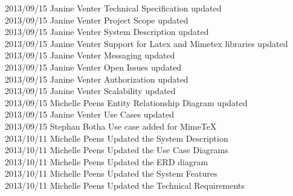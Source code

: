 \documentclass[29pt,a4paper]{moderncv}
\begin{document}
\begin{tabbing}
2013/09/15  \>  Janine Venter \> Technical Specification updated\\
2013/09/15  \> Janine Venter \> Project Scope updated\\
2013/09/15  \>  Janine Venter \> System Description updated\\
2013/09/15 \> Janine Venter \> Support for Latex and Mimetex libraries updated\\
2013/09/15  \> Janine Venter \> Messaging updated\\
2013/09/15  \>  Janine Venter \> Open Issues updated\\
2013/09/15  \> Janine Venter \> Authorization updated\\
2013/09/15  \> Janine Venter \> Scalability updated\\
2013/09/15  \> Michelle Peens \> Entity Relationship Diagram updated\\
2013/09/15  \> Janine Venter \> Use Cases updated\\
2013/09/15  \> Stephan Botha \> Use case added for MimeTeX\\
2013/10/11  \> Michelle Peens \> Updated the System Description\\
2013/10/11  \> Michelle Peens \> Updated the Use Case Diagrams\\
2013/10/11  \> Michelle Peens \> Updated the ERD diagram\\
2013/10/11  \> Michelle Peens \> Updated the System Features\\
2013/10/11  \> Michelle Peens \> Updated the Technical Requirements\\


\end{tabbing}


\newpage
\end{document}
